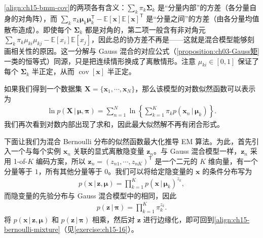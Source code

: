 \documentclass[../../main.tex]{subfiles}
\begin{document}
\begin{remark}
\eqref{align:ch15-bmm-cov}的两项各有含义：$\sum_k\pi_k\bm{\Sigma}_k$ 是“分量内部”的方差（各分量自身的对角阵），而 $\sum_k\pi_k\bm{\mu}_k\bm{\mu}_k^{\mathsf T}-\mathbb{E}[\bm{x}]\mathbb{E}[\bm{x}]^{\mathsf T}$ 是“分量之间”的方差（由各分量均值散布造成）。即使每个 $\bm{\Sigma}_k$ 都是对角的，第二项一般含有非对角元 $\sum_k\pi_k\mu_{ki}\mu_{kj}-\mathbb{E}[x_i]\mathbb{E}[x_j]$，因此总的协方差不再是——这就是混合模型能够刻画相关性的原因。这一分解与 Gauss 混合的对应公式（\cref{proposition:ch03-Gauss矩}一类的恒等式）同源，只是把连续情形换成了离散情形。注意 $\mu_{ki}\in[0,1]$ 保证了每个 $\bm{\Sigma}_k$ 半正定，从而 $\operatorname{cov}[\bm{x}]$ 半正定。
\end{remark}

如果我们得到一个数据集 $\bm{X}=\{\bm{x}_1,\cdots,\bm{x}_N\}$，那么该模型的对数似然函数可以表示为
\begin{align}
\ln p(\bm{X}\,|\,\bm{\mu},\bm{\pi})=\sum_{n=1}^{N}\ln\!\left\{\sum_{k=1}^{K}\pi_k p(\bm{x}_n\,|\,\bm{\mu}_k)\right\}.
\label{align:ch15-bmm-nll}
\end{align}
我们再次看到对数内部出现了求和，因此最大似然解不再有闭合形式。

下面让我们为混合 Bernoulli 分布的似然函数最大化推导 EM 算法。为此，首先引入一个与每个实例 $\bm{x}_n$ 关联的显式离散隐变量 $\bm{z}_n$。与 Gauss 混合模型一样，$\bm{z}_n$ 采用 1-of-$K$ 编码方案，所以 $\bm{z}_n=(z_{n1},\cdots,z_{nK})^{\mathsf T}$ 是一个二元的 $K$ 维向量，有一个分量等于 $1$，所有其他分量等于 $0$。我们可以将给定隐变量的 $\bm{x}$ 的条件分布写为
\begin{align}
p(\bm{x}\,|\,\bm{z},\bm{\mu})=\prod_{k=1}^{K}p(\bm{x}\,|\,\bm{\mu}_k)^{z_k},
\label{align:ch15-bmm-conditional}
\end{align}
而隐变量的先验分布与 Gauss 混合模型中的相同，因此
\begin{align}
p(\bm{z}\,|\,\bm{\pi})=\prod_{k=1}^{K}\pi_k^{z_k}.
\label{align:ch15-bmm-prior}
\end{align}
将 $p(\bm{x}\,|\,\bm{z},\bm{\mu})$ 和 $p(\bm{z}\,|\,\bm{\pi})$ 相乘，然后对 $\bm{z}$ 进行边缘化，即可回到\eqref{align:ch15-bernoulli-mixture}（见\cref{exercise:ch15-16}）。
\end{document}
